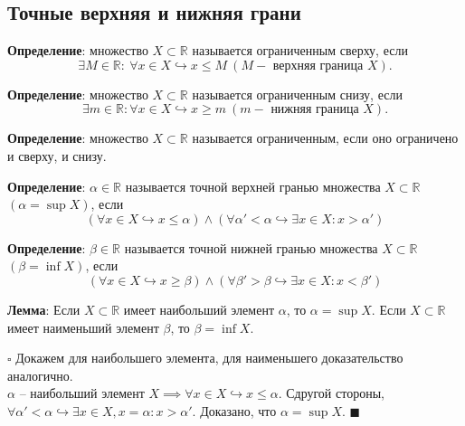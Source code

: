 \documentclass[12pt, a4paper, reqno]{article}
\begin{document}
\subsection{Точные верхняя и нижняя грани}

    \textbf{Определение}: множество $X \subset \mathbb{R}$ называется ограниченным сверху, если
    \begin{equation*}
        \exists M\in\mathbb{R}:\ \forall x\in X \hookrightarrow x \leq M\
        (M - \text{ верхняя граница } X).
    \end{equation*}

    \textbf{Определение}: множество $X \subset \mathbb{R}$ называется ограниченным снизу, если
    \begin{equation*}
        \exists m\in\mathbb{R}: \forall x\in X \hookrightarrow x \geq m\
        (m - \text{ нижняя граница } X).
    \end{equation*}

    \textbf{Определение}: множество $X \subset \mathbb{R}$ называется ограниченным, если оно
    ограничено и сверху, и снизу.

    \textbf{Определение}: $\alpha\in\mathbb{R}$ называется точной верхней гранью множества
    $X \subset \mathbb{R}$ $(\alpha = \sup X)$, если
    \begin{equation*}
        (\forall x\in X \hookrightarrow x \leq\alpha)\wedge
        (\forall\alpha' < \alpha \hookrightarrow \exists x\in X: x > \alpha')
    \end{equation*}

    \textbf{Определение}: $\beta\in\mathbb{R}$ называется точной нижней гранью множества
    $X \subset \mathbb{R}$ $(\beta = \inf X)$, если
    \begin{equation*}
        (\forall x\in X \hookrightarrow x \geq\beta)\wedge
        (\forall\beta' > \beta \hookrightarrow \exists x\in X: x < \beta')
    \end{equation*}

    \textbf{Лемма}: Если $X \subset \mathbb{R}$ имеет наибольший элемент $\alpha$, то $\alpha = \sup X$.
    Если $X \subset \mathbb{R}$ имеет наименьший элемент $\beta$, то $\beta = \inf X$.

    $\square$ Докажем для наибольшего элемента, для наименьшего доказательство аналогично.\\
    $\alpha$ -- наибольший элемент $X \implies \forall x\in X \hookrightarrow x \leq \alpha$. Сдругой
    стороны, $\forall\alpha' < \alpha \hookrightarrow \exists x\in X, x = \alpha: x > \alpha'$.
    Доказано, что $\alpha = \sup X$. $\blacksquare$
\end{document}

